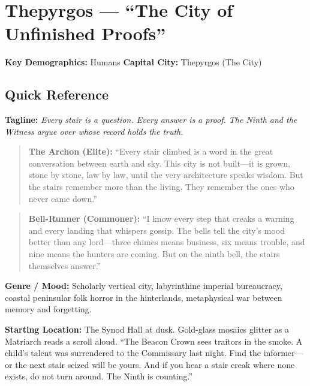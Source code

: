 \section{Thepyrgos --- ``The City of Unfinished Proofs''}
\label{chap:thepyrgos}

\textbf{Key Demographics: } Humans
\textbf{Capital City: } Thepyrgos (The City)

\subsection*{Quick Reference}
\textbf{Tagline:} \textit{Every stair is a question. Every answer is a proof. The Ninth and the Witness argue over whose record holds the truth.}

\begin{quote}
  \textbf{The Archon (Elite):}  
  ``Every stair climbed is a word in the great conversation between earth and sky. This city is not built---it is grown, stone by stone, law by law, until the very architecture speaks wisdom. But the stairs remember more than the living. They remember the ones who never came down.''
\end{quote}

\begin{quote}
  \textbf{Bell-Runner (Commoner):}  
  ``I know every step that creaks a warning and every landing that whispers gossip. The bells tell the city's mood better than any lord---three chimes means business, six means trouble, and nine means the hunters are coming. But on the ninth bell, the stairs themselves answer.''
\end{quote}

\noindent\textbf{Genre / Mood:} Scholarly vertical city, labyrinthine imperial bureaucracy, coastal peninsular folk horror in the hinterlands, metaphysical war between memory and forgetting.

\noindent\textbf{Starting Location:} The Synod Hall at dusk. Gold-glass mosaics glitter as a Matriarch reads a scroll aloud. ``The Beacon Crown sees traitors in the smoke. A child's talent was surrendered to the Commissary last night. Find the informer---or the next stair seized will be yours. And if you hear a stair creak where none exists, do not turn around. The Ninth is counting.''

